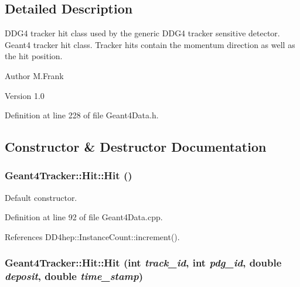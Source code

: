 \subsection{Detailed Description}
DDG4 tracker hit class used by the generic DDG4 tracker sensitive detector. Geant4 tracker hit class. Tracker hits contain the momentum direction as well as the hit position.

\begin{DoxyAuthor}{Author}
M.Frank 
\end{DoxyAuthor}
\begin{DoxyVersion}{Version}
1.0 
\end{DoxyVersion}


Definition at line 228 of file Geant4Data.h.

\subsection{Constructor \& Destructor Documentation}
\hypertarget{class_d_d4hep_1_1_simulation_1_1_geant4_tracker_1_1_hit_a0a9d1a37e9de22e048ad01d09abeea3a}{
\subsubsection[{Hit}]{\setlength{\rightskip}{0pt plus 5cm}Geant4Tracker::Hit::Hit ()}}
\label{class_d_d4hep_1_1_simulation_1_1_geant4_tracker_1_1_hit_a0a9d1a37e9de22e048ad01d09abeea3a}


Default constructor. 

Definition at line 92 of file Geant4Data.cpp.

References DD4hep::InstanceCount::increment().\hypertarget{class_d_d4hep_1_1_simulation_1_1_geant4_tracker_1_1_hit_a2f02d476b53ca077e7bb1326e99a4267}{
\subsubsection[{Hit}]{\setlength{\rightskip}{0pt plus 5cm}Geant4Tracker::Hit::Hit (int {\em track\_\-id}, \/  int {\em pdg\_\-id}, \/  double {\em deposit}, \/  double {\em time\_\-stamp})}}
\label{class_d_d4hep_1_1_simulation_1_1_geant4_tracker_1_1_hit_a2f02d476b53ca077e7bb1326e99a4267}


